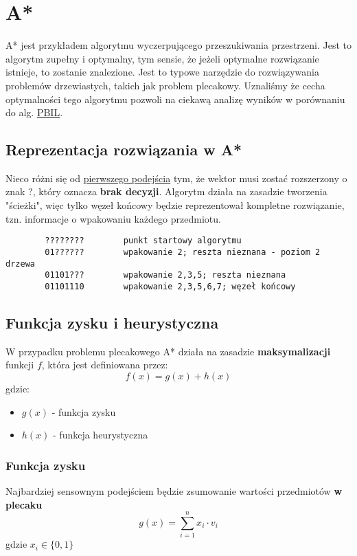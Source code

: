 \documentclass[11pt]{article}
\begin{document}
\section{A*}
\label{sec:orgf031526}
A* jest przykładem algorytmu wyczerpującego przeszukiwania przestrzeni. Jest to algorytm zupełny i optymalny, tym sensie, że jeżeli optymalne rozwiązanie istnieje, to zostanie znalezione. Jest to typowe narzędzie do rozwiązywania problemów drzewiastych, takich jak problem plecakowy. Uznaliśmy że cecha optymalności tego algorytmu pozwoli na ciekawą analizę wyników w porównaniu do alg. \hyperref[sec:orgf10ee1e]{\uline{PBIL}}.
\subsection{Reprezentacja rozwiązania w A*}
\label{sec:org7be9935}
Nieco różni się od \hyperref[sec:orgd3d7332]{pierwszego podejścia} tym, że wektor musi zostać rozszerzony o znak ?, który oznacza \textbf{brak decyzji}. Algorytm działa na zasadzie tworzenia "ścieżki", więc tylko węzeł końcowy będzie reprezentował kompletne rozwiązanie, tzn. informacje o wpakowaniu każdego przedmiotu.
\begin{verbatim}
        ????????        punkt startowy algorytmu
        01??????        wpakowanie 2; reszta nieznana - poziom 2 drzewa
        01101???        wpakowanie 2,3,5; reszta nieznana
        01101110        wpakowanie 2,3,5,6,7; węzeł końcowy
\end{verbatim}
\subsection{Funkcja zysku i heurystyczna}
\label{sec:orgdb35587}
W przypadku problemu plecakowego A* działa na zasadzie \textbf{maksymalizacji} funkcji \(f\), która jest definiowana przez:
$$
        f(x) = g(x) + h(x)
$$
gdzie:
\begin{itemize}
\item \(g(x)\) - funkcja zysku
\item \(h(x)\) - funkcja heurystyczna
\end{itemize}
\subsubsection{Funkcja zysku}
\label{sec:org244d765}
Najbardziej sensownym podejściem będzie zsumowanie wartości przedmiotów \textbf{w plecaku}
$$
        g(x) = \sum_{i=1}^n{x_i \cdot v_i}
$$
gdzie \(x_i \in \{0, 1\}\)
\end{document}
